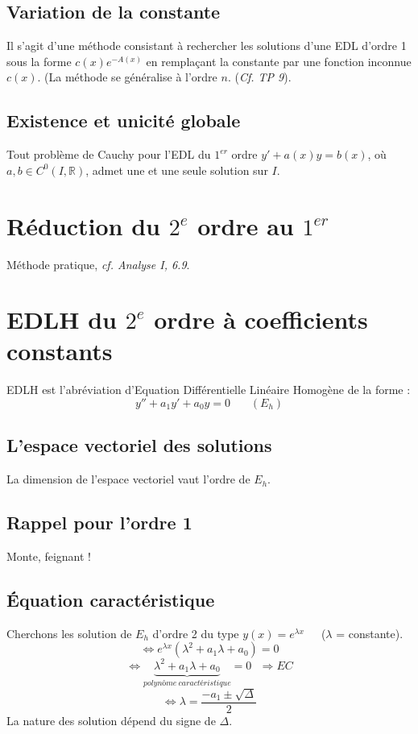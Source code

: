 \documentclass	[11pt, a4paper, openany]{book}
\begin{document}
\subsection{Variation de la constante}
Il s'agit d'une méthode consistant à rechercher les solutions d'une EDL d'ordre 1 sous la forme $c(x)e^{-A(x)}$ en remplaçant la constante par une fonction inconnue $c(x)$. (La méthode se généralise à l'ordre $n$. (\textit{Cf. TP 9}).

\subsection{Existence et unicité globale}
Tout problème de Cauchy pour l'EDL du $1^{er}$ ordre $y'+a(x)y = b(x)$, où $a, b \in C^0(I, \mathbb{R})$, admet une et une seule solution sur $I$.

\section{Réduction du $2^e$ ordre au $1^{er}$}
Méthode pratique, \textit{cf. Analyse I, 6.9}.

\section{EDLH du $2^e$ ordre à coefficients constants}
EDLH est l'abréviation d'Equation Différentielle Linéaire Homogène de la forme :
$$y'' + a_1y' + a_0y = 0\ \ \ \ \ \ \ \ (E_h)$$
\subsection{L'espace vectoriel des solutions}
La dimension de l'espace vectoriel vaut l'ordre de $E_h$.

\subsection{Rappel pour l'ordre 1}
Monte, feignant !

\subsection{Équation caractéristique}
Cherchons les solution de $E_h$ d'ordre 2 du type $y(x) = e^{\lambda x}$\ \ \ ($\lambda$ = constante).\\
$$\Leftrightarrow e^{\lambda x}(\lambda^2 + a_1\lambda + a_0) = 0$$
$$\Leftrightarrow \underbrace{\lambda^2 + a_1\lambda + a_0}_{polynôme\ caractéristique} = 0\ \ \ \Rightarrow EC$$
$$\Leftrightarrow \lambda = \frac{-a_1 \pm \sqrt{\Delta}}{2}$$
La nature des solution dépend du signe de $\Delta$.
\end{document}
